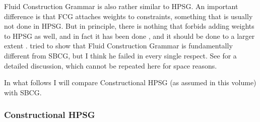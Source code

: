 \documentclass[output=paper,biblatex,babelshorthands,newtxmath,draftmode,colorlinks,citecolor=brown]{langscibook}
\begin{document}
\largerpage[2]%
Fluid Construction Grammar is also rather similar to HPSG. An important difference is that FCG attaches
weights to constraints, something that is usually not done in HPSG. But in principle, there is
nothing that forbids adding weights to HPSG as well, and in fact it has been done \citep{Brew95a,BC99a,MT2008a-u}, and it should be
done to a larger extent \citep{Miller2013a}.  tried to show that
Fluid Construction Grammar is fundamentally different from SBCG, but I think he failed in every
single respect. See  for a detailed discussion, which cannot be repeated here for
space reasons.

In what follows I will compare Constructional HPSG (as assumed in this volume) with SBCG.






\subsubsection{Constructional HPSG}
\label{sec-constructional-hpsg}
\end{document}
